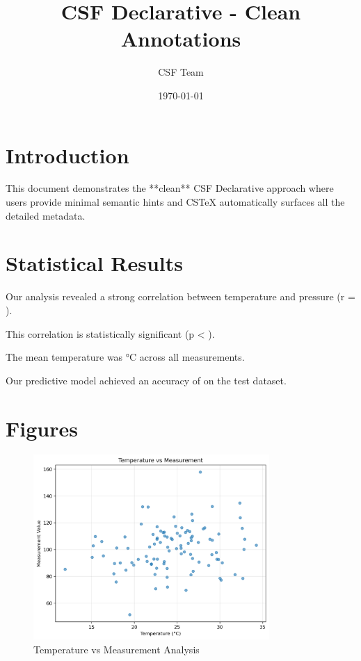 \documentclass{article}
\title{CSF Declarative - Clean Annotations}
\author{CSF Team}
\date{\today}
\begin{document}
\maketitle

\section{Introduction}

This document demonstrates the **clean** CSF Declarative approach where users provide
minimal semantic hints and CSTeX automatically surfaces all the detailed metadata.

\section{Statistical Results}

Our analysis revealed a strong correlation between temperature and pressure 
(r = ).

This correlation is statistically significant (p < ).

The mean temperature was °C across all measurements.

Our predictive model achieved an accuracy of  on the test dataset.

\section{Figures}

\begin{figure}[h]
\centering
\includegraphics[width=0.8\textwidth]{figures/temperature_measurement.png}
\caption{Temperature vs Measurement Analysis}
\label{fig:temp}
\end{figure}
\end{document}
